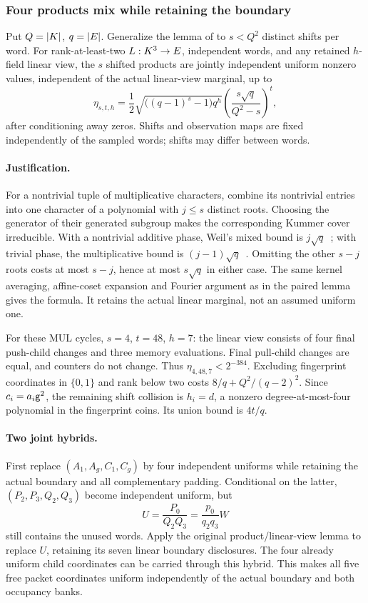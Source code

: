 \subsubsection{Four products mix while retaining the boundary}

Put $Q=|K|$, $q=|E|$. Generalize the lemma of  to $s<Q^2$ distinct shifts per word. For rank-at-least-two $L:K^3\to E$, independent words, and any retained $h$-field linear view, the $s$ shifted products are jointly independent uniform nonzero values, independent of the actual linear-view marginal, up to
\[
 \eta_{s,t,h}=\frac12\sqrt{\bigl((q-1)^s-1\bigr)q^h}
 \left(\frac{s\sqrt q}{Q^2-s}\right)^t,
\]
after conditioning away zeros. Shifts and observation maps are fixed independently of the sampled words; shifts may differ between words.

\paragraph{Justification.} For a nontrivial tuple of multiplicative characters, combine its nontrivial entries into one character of a polynomial with $j\le s$ distinct roots. Choosing the generator of their generated subgroup makes the corresponding Kummer cover irreducible. With a nontrivial additive phase, Weil's mixed bound is $j\sqrt q$~\cite{winger}; with trivial phase, the multiplicative bound is $(j-1)\sqrt q$~\cite{kowalski}. Omitting the other $s-j$ roots costs at most $s-j$, hence at most $s\sqrt q$ in either case. The same kernel averaging, affine-coset expansion and Fourier argument as in the paired lemma gives the formula. It retains the actual linear marginal, not an assumed uniform one.

For these MUL cycles, $s=4$, $t=48$, $h=7$: the linear view consists of four final push-child changes and three memory evaluations. Final pull-child changes are equal, and counters do not change. Thus $\eta_{4,48,7}<2^{-384}$. Excluding fingerprint coordinates in $\{0,1\}$ and rank below two costs $8/q+Q^2/(q-2)^2$. Since $c_i=a_i\mathsf{g}^2$, the remaining shift collision is $h_i=d$, a nonzero degree-at-most-four polynomial in the fingerprint coins. Its union bound is $4t/q$.

\paragraph{Two joint hybrids.} First replace $(A_1,A_g,C_1,C_g)$ by four independent uniforms while retaining the actual boundary and all complementary padding. Conditional on the latter, $(P_2,P_3,Q_2,Q_3)$ become independent uniform, but
\[
 U=\frac{P_0}{Q_2Q_3}=\frac{p_0}{q_2q_3}W
\]
still contains the unused words. Apply the original product/linear-view lemma to replace $U$, retaining its seven linear boundary disclosures. The four already uniform child coordinates can be carried through this hybrid. This makes all five free packet coordinates uniform independently of the actual boundary and both occupancy banks.

